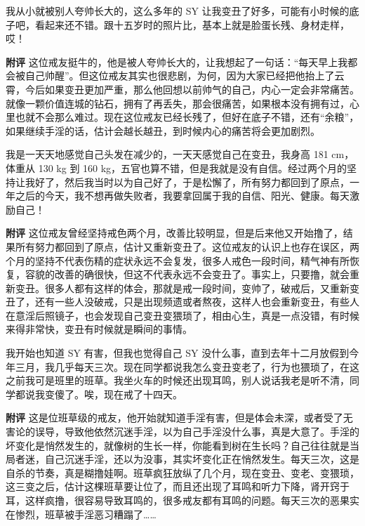 \begin{case}[变丑]
    我从小就被别人夸帅长大的，这么多年的 SY 让我变丑了好多，可能有小时候的底子吧，看起来还不错。跟十五岁时的照片比，基本上就是脸蛋长残、身材走样，哎！

    \textbf{附评} 这位戒友挺牛的，他是被人夸帅长大的，让我想起了一句话：“每天早上我都会被自己帅醒”。但这位戒友其实也很悲剧，为何，因为大家已经把他抬上了云霄，今后如果变丑更加严重，那么他回想以前帅气的自己，内心一定会非常痛苦。就像一颗价值连城的钻石，拥有了再丢失，那会很痛苦，如果根本没有拥有过，心里也就不会那么难过。现在这位戒友已经长残了，但好在底子不错，还有“余粮”，如果继续手淫的话，估计会越长越丑，到时候内心的痛苦将会更加剧烈。
\end{case}

\begin{case}[变丑]
    我是一天天地感觉自己头发在减少的，一天天感觉自己在变丑，我身高 181 \unit{\cm}，体重从 130 \unit{\kg} 到 160 \unit{\kg}，五官也算不错，但是我就是没有自信。经过两个月的坚持让我好了，然后我当时以为自己好了，于是松懈了，所有努力都回到了原点，一年之后的今天，我不想再做失败者，我要拿回属于我的自信、阳光、健康。每天激励自己！

    \textbf{附评} 这位戒友曾经坚持戒色两个月，改善比较明显，但是后来他又开始撸了，结果所有努力都回到了原点，估计又重新变丑了。这位戒友的认识上也存在误区，两个月的坚持不代表伤精的症状永远不会复发，很多人戒色一段时间，精气神有所恢复，容貌的改善的确很快，但这不代表永远不会变丑了。事实上，只要撸，就会重新变丑。很多人都有这样的体会，那就是戒一段时间，变帅了，破戒后，又重新变丑了，还有一些人没破戒，只是出现频遗或者熬夜，这样人也会重新变丑，有些人在意淫后照镜子，也会发现自己变丑变猥琐了，相由心生，真是一点没错，有时候来得非常快，变丑有时候就是瞬间的事情。
\end{case}

\begin{case}[变丑]
    我开始也知道 SY 有害，但我也觉得自己 SY 没什么事，直到去年十二月放假到今年三月，我几乎每天三次。现在同学都说我怎么变丑变老了，行为也猥琐了，在这之前我可是班里的班草。我坐火车的时候还出现耳鸣，别人说话我老是听不清，同学都说我变傻了。唉，现在戒了十四天。

    \textbf{附评} 这是位班草级的戒友，他开始就知道手淫有害，但是体会未深，或者受了无害论的误导，导致他依然沉迷手淫，以为自己手淫没什么事，真是大意了。手淫的坏变化是悄然发生的，就像树的生长一样，你能看到树在生长吗？自己往往就是当局者迷，自己沉迷手淫，还以为没事，其实坏变化正在悄然发生。每天三次，这是自杀的节奏，真是糊撸娃啊。班草疯狂放纵了几个月，现在变丑、变老、变猥琐，这三变之后，估计这棵班草要让位了，而且还出现了耳鸣和听力下降，肾开窍于耳，这样疯撸，很容易导致耳鸣的，很多戒友都有耳鸣的问题。每天三次的恶果实在惨烈，班草被手淫恶习糟蹋了……
\end{case}

